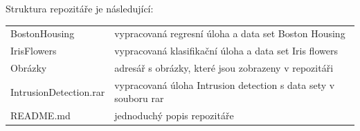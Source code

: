 \documentclass[male,czech,api_ing]{thesis}
\begin{document}

Struktura repozitáře je následující:
\begin{longtable}{ll}
\hline
BostonHousing & vypracovaná regresní úloha a data set Boston Housing \\
IrisFlowers & vypracovaná klasifikační úloha a data set Iris flowers \\
Obrázky & adresář s obrázky, které jsou zobrazeny v repozitáři \\
IntrusionDetection.rar & vypracovaná úloha Intrusion detection s data sety v souboru rar\\
README.md & jednoduchý popis repozitáře\\
\hline
\end{longtable}

\end{document}
